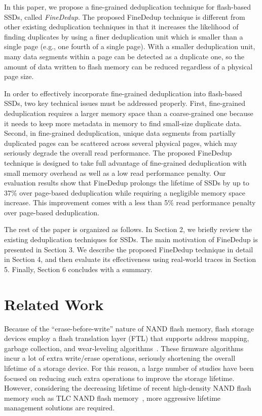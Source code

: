 In this paper, 
we propose a fine-grained deduplication technique for flash-based SSDs, called \textit{FineDedup}.
The proposed FineDedup technique is different from other existing deduplication techniques
in that it increases the likelihood of finding duplicates
by using a finer deduplication unit
which is smaller than a single page (e.g., one fourth of a single page).
With a smaller deduplication unit,
many data segments within a page can be detected as a duplicate one, 
so the amount of data written to flash memory can be reduced regardless of a physical page size.

In order to effectively incorporate fine-grained deduplication into flash-based SSDs,
two key technical issues must be addressed properly.
First, fine-grained deduplication requires a larger memory space than a coarse-grained one 
because it needs to keep more metadata in memory to find small-size duplicate data.
Second, in fine-grained deduplication, 
unique data segments from partially duplicated pages can be scattered across several physical pages,
which may seriously degrade the overall read performance.
The proposed FineDedup technique is designed to take full advantage of fine-grained deduplication
with small memory overhead as well as a low read performance penalty.
Our evaluation results show that 
FineDedup prolongs the lifetime of SSDs by up to 37\% over page-based deduplication
while requiring a negligible memory space increase.
This improvement comes with a less than 5\% read performance penalty over page-based deduplication.

The rest of the paper is organized as follows. 
In Section 2, we briefly review the existing deduplication techniques for SSDs.
The main motivation of FineDedup is presented in Section 3.
We describe the proposed FineDedup technique in detail in Section 4,
and then evaluate its effectiveness using real-world traces in Section 5. 
Finally, Section 6 concludes with a summary.

\section{Related Work}
Because of the ``erase-before-write'' nature of NAND flash memory, 
flash storage devices employ a flash translation layer (FTL) 
that supports address mapping, garbage collection, and wear-leveling algorithms~\cite{FAST}. %
These firmware algorithms incur a lot of extra write/erase operations,
seriously shortening the overall lifetime of a storage device.
For this reason, a large number of studies have been focused on reducing such extra operations to improve the storage 
lifetime.
However, considering the decreasing lifetime of recent high-density NAND flash memory such as TLC NAND flash memory~\cite{tlc}, %
more aggressive lifetime management solutions are required. 

